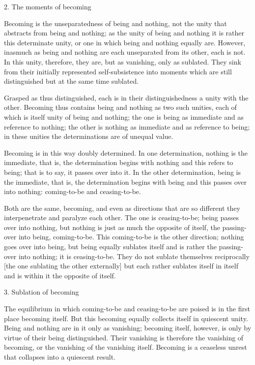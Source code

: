 2. The moments of becoming

Becoming is the unseparatedness of being and nothing,
not the unity that abstracts from being and nothing;
as the unity of being and nothing
it is rather this determinate unity,
or one in which being and nothing equally are.
However, inasmuch as being and nothing are
each unseparated from its other, each is not.
In this unity, therefore, they are,
but as vanishing, only as sublated.
They sink from their initially represented self-subsistence
into moments which are still distinguished
but at the same time sublated.

Grasped as thus distinguished,
each is in their distinguishedness
a unity with the other.
Becoming thus contains being and nothing as two such unities,
each of which is itself unity of being and nothing;
the one is being as immediate and as reference to nothing;
the other is nothing as immediate and as reference to being;
in these unities the determinations are of unequal value.

Becoming is in this way doubly determined.
In one determination, nothing is the immediate,
that is, the determination begins with nothing
and this refers to being;
that is to say, it passes over into it.
In the other determination, being is the immediate,
that is, the determination begins with being
and this passes over into nothing:
coming-to-be and ceasing-to-be.

Both are the same, becoming,
and even as directions that are so different
they interpenetrate and paralyze each other.
The one is ceasing-to-be;
being passes over into nothing,
but nothing is just as much the opposite of itself,
the passing-over into being, coming-to-be.
This coming-to-be is the other direction;
nothing goes over into being,
but being equally sublates itself
and is rather the passing-over into nothing;
it is ceasing-to-be.
They do not sublate themselves reciprocally
[the one sublating the other externally]
but each rather sublates itself in itself
and is within it the opposite of itself.

3. Sublation of becoming

The equilibrium in which coming-to-be and ceasing-to-be are poised
is in the first place becoming itself.
But this becoming equally collects itself in quiescent unity.
Being and nothing are in it only as vanishing;
becoming itself, however, is only by virtue of their being distinguished.
Their vanishing is therefore the vanishing of becoming,
or the vanishing of the vanishing itself.
Becoming is a ceaseless unrest that collapses into a quiescent result.

